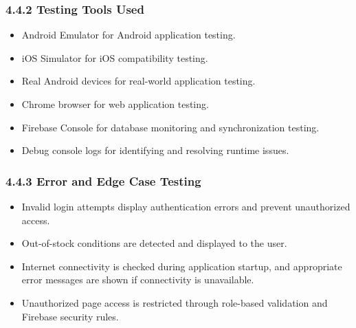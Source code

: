 \documentclass[12pt, oneside]{article}
\begin{document}
\subsubsection*{4.4.2 Testing Tools Used}
\begin{itemize}
    \item Android Emulator for Android application testing.
    \item iOS Simulator for iOS compatibility testing.
    \item Real Android devices for real-world application testing.
    \item Chrome browser for web application testing.
    \item Firebase Console for database monitoring and synchronization testing.
    \item Debug console logs for identifying and resolving runtime issues.
\end{itemize}

\subsubsection*{4.4.3 Error and Edge Case Testing}
\begin{itemize}
    \item Invalid login attempts display authentication errors and prevent unauthorized access.
    \item Out-of-stock conditions are detected and displayed to the user.
    \item Internet connectivity is checked during application startup, and appropriate error messages are shown if connectivity is unavailable.
    \item Unauthorized page access is restricted through role-based validation and Firebase security rules.
\end{itemize}
\end{document}
